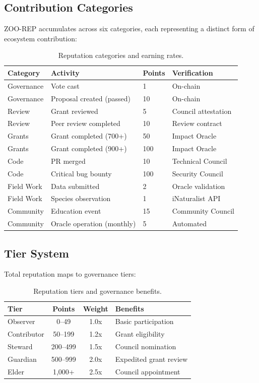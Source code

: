 \documentclass[11pt,letterpaper]{article}
\begin{document}
\subsection{Contribution Categories}

ZOO-REP accumulates across six categories, each representing a distinct form of ecosystem contribution:

\begin{table}[h]
\centering
\caption{Reputation categories and earning rates.}
\label{tab:categories}
\begin{tabular}{p{3cm}lll}
\toprule
\textbf{Category} & \textbf{Activity} & \textbf{Points} & \textbf{Verification} \\
\midrule
Governance & Vote cast & 1 & On-chain \\
Governance & Proposal created (passed) & 10 & On-chain \\
Review & Grant reviewed & 5 & Council attestation \\
Review & Peer review completed & 10 & Review contract \\
Grants & Grant completed (700+) & 50 & Impact Oracle \\
Grants & Grant completed (900+) & 100 & Impact Oracle \\
Code & PR merged & 10 & Technical Council \\
Code & Critical bug bounty & 100 & Security Council \\
Field Work & Data submitted & 2 & Oracle validation \\
Field Work & Species observation & 1 & iNaturalist API \\
Community & Education event & 15 & Community Council \\
Community & Oracle operation (monthly) & 5 & Automated \\
\bottomrule
\end{tabular}
\end{table}

\subsection{Tier System}

Total reputation maps to governance tiers:

\begin{table}[h]
\centering
\caption{Reputation tiers and governance benefits.}
\label{tab:tiers}
\begin{tabular}{lccl}
\toprule
\textbf{Tier} & \textbf{Points} & \textbf{Weight} & \textbf{Benefits} \\
\midrule
Observer & 0--49 & 1.0x & Basic participation \\
Contributor & 50--199 & 1.2x & Grant eligibility \\
Steward & 200--499 & 1.5x & Council nomination \\
Guardian & 500--999 & 2.0x & Expedited grant review \\
Elder & 1{,}000+ & 2.5x & Council appointment \\
\bottomrule
\end{tabular}
\end{table}
\end{document}
